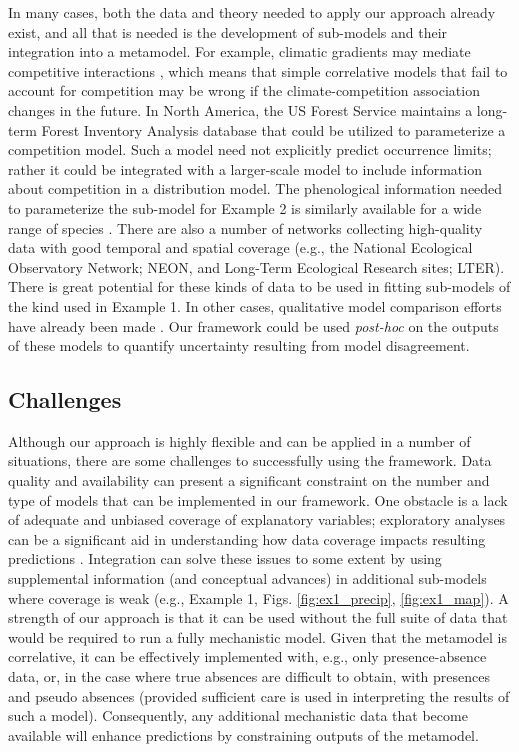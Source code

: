 \documentclass[11pt]{article}
\begin{document}
In many cases, both the data and theory needed to apply our approach already exist, and all that is needed is the development of sub-models and their integration into a metamodel.
For example, climatic gradients may mediate competitive interactions \citep{Kunstler2011}, which means that simple correlative models that fail to account for competition may be wrong if the climate-competition association changes in the future.
In North America, the US Forest Service maintains a long-term Forest Inventory Analysis database that could be utilized to parameterize a competition model.
Such a model need not explicitly predict occurrence limits; rather it could be integrated with a larger-scale model to include information about competition in a distribution model.
The phenological information needed to parameterize the sub-model for Example 2 is similarly available for a wide range of species \citep{Morin2009}.
There are also a number of networks collecting high-quality data with good temporal and spatial coverage (e.g., the National Ecological Observatory Network; NEON, and Long-Term Ecological Research sites; LTER).
There is great potential for these kinds of data to be used in fitting sub-models of the kind used in Example 1.
In other cases, qualitative model comparison efforts have already been made \citep{Morin2009, Cheaib2012}.
Our framework could be used \emph{post-hoc} on the outputs of these models to quantify uncertainty resulting from model disagreement.


\subsection*{Challenges} 
Although our approach is highly flexible and can be applied in a number of situations, there are some challenges to successfully using the framework.
Data quality and availability can present a significant constraint on the number and type of models that can be implemented in our framework.
One obstacle is a lack of adequate and unbiased coverage of explanatory variables; exploratory analyses can be a significant aid in understanding how data coverage impacts resulting predictions \citep{Mckenney2002}.
Integration can solve these issues to some extent by using supplemental information (and conceptual advances) in additional sub-models where coverage is weak (e.g., Example 1, Figs. \ref{fig:ex1_precip}, \ref{fig:ex1_map}).
A strength of our approach is that it can be used without the full suite of data that would be required to run a fully mechanistic model. 
Given that the metamodel is correlative, it can be effectively implemented with, e.g., only presence-absence data, or, in the case where true absences are difficult to obtain, with presences and pseudo absences (provided sufficient care is used in interpreting the results of such a model).
Consequently, any additional mechanistic data that become available will enhance predictions by constraining outputs of the metamodel. 
\end{document}
